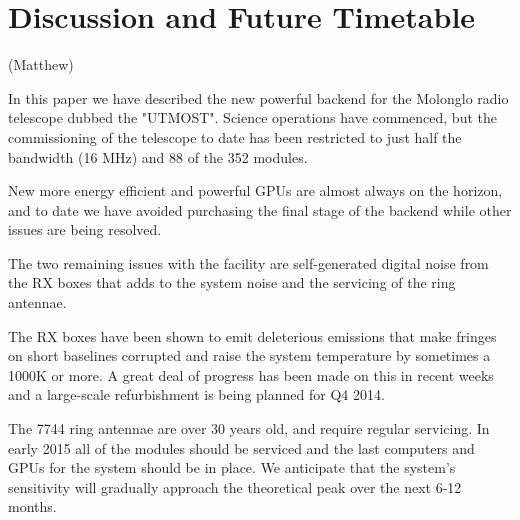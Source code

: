\section{Discussion and Future Timetable}(Matthew)

In this paper we have described the new powerful backend for the Molonglo radio telescope dubbed the "UTMOST". Science operations have commenced, but the commissioning of the telescope to date has been restricted to just half the bandwidth (16 MHz) and 88 of the 352 modules. 

New more energy efficient and powerful GPUs are almost always on the horizon, and to date we have avoided purchasing the final stage of the backend while other issues are being resolved.

The two remaining issues with the facility are self-generated digital noise from the RX boxes that adds to the system noise and the servicing of the ring antennae. 

The RX boxes have been shown to emit deleterious emissions that make fringes on short baselines corrupted and raise the system temperature by sometimes a 1000K or more. A great deal of progress has been made on this in recent weeks and a large-scale refurbishment is being planned for Q4 2014.

The 7744 ring antennae are over 30 years old, and require regular servicing. In early 2015 all of the modules should be serviced and the last computers and GPUs for the system should be in place. We anticipate that the system's sensitivity will gradually approach the theoretical peak over the next 6-12 months.